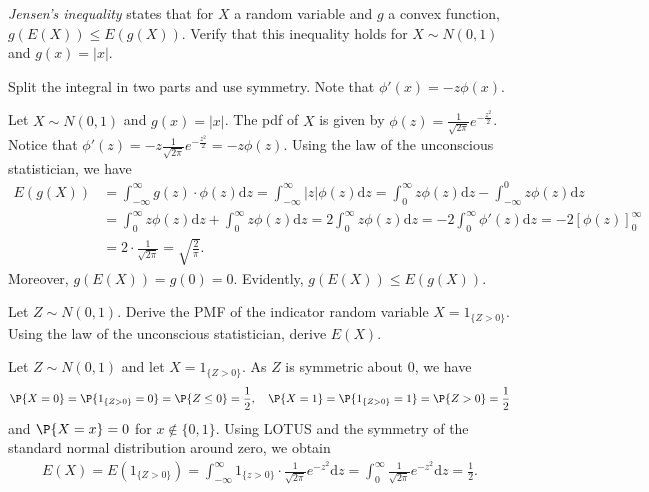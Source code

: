 	\begin{exercise}
		\emph{Jensen's inequality} states that for $X$ a random variable and $g$ a convex function, $g(E(X)) \leq E(g(X))$. Verify that this inequality holds for $X \sim N(0,1)$ and $g(x) = |x|$.
		\begin{hint}
			Split the integral in two parts and use symmetry. Note that $\phi'(x) = -z \phi(x)$.
		\end{hint}
		\begin{solution}
			Let $X \sim N(0,1)$ and $g(x) = |x|$. The pdf of $X$ is given by $\phi(z) = \frac{1}{\sqrt{2 \pi}} e^{- \frac{z^2}{2}}$. Notice that $\phi'(z) = - z \frac{1}{\sqrt{2 \pi}} e^{- \frac{z^2}{2}} = -z \phi(z)$. Using the law of the unconscious statistician, we have
			\begin{align*}
				E(g(X)) & = \int_{-\infty}^{\infty} g(z) \cdot \phi(z) \mathrm{d}z = \int_{-\infty}^{\infty} |z| \phi(z) \mathrm{d}z = \int_0^{\infty} z \phi(z) \mathrm{d}z - \int_{-\infty}^0 z \phi(z) \mathrm{d}z \\
				& = \int_0^{\infty} z \phi(z) \mathrm{d}z + \int_0^{\infty} z \phi(z) \mathrm{d}z = 2 \int_0^{\infty} z \phi(z) \mathrm{d}z = - 2 \int_0^{\infty} \phi'(z) \mathrm{d}z = - 2 \left[\phi(z)\right]_0^{\infty} \\
				& = 2 \cdot \frac{1}{\sqrt{2 \pi}} = \sqrt{\frac{2}{\pi}}.	
			\end{align*}
			Moreover, $g(E(X)) = g(0) = 0$. Evidently, $g(E(X)) \leq E(g(X))$.
		\end{solution}
	\end{exercise}

	\begin{exercise}
	Let $Z \sim N(0,1)$. Derive the PMF of the indicator random variable $X=1_{\{Z>0\}}$. Using the law of the unconscious statistician, derive $E(X)$.
		\begin{solution}
			Let $Z \sim N(0,1)$ and let $X = 1_{\{Z>0\}}$. As $Z$ is symmetric about $0$, we have
			\begin{align*}
				\P{X = 0} = \P{1_{\{Z>0\}} = 0} = \P{Z \leq 0} = \frac{1}{2}, \quad \P{X = 1} = \P{1_{\{Z>0\}} = 1} = \P{Z > 0} = \frac{1}{2}
			\end{align*}
			and $\P{X = x} = 0$ for $x \notin \{0,1\}$. Using LOTUS and the symmetry of the standard normal distribution around zero, we obtain
			\begin{align*}
				E(X) = E\left(1_{\{Z>0\}}\right) = \int_{-\infty}^{\infty} 1_{\{z > 0\}} \cdot \frac{1}{\sqrt{2 \pi}} e^{-z^2} \mathrm{d}z = \int_0^{\infty} \frac{1}{\sqrt{2 \pi}} e^{-z^2} \mathrm{d}z = \frac{1}{2}.
			\end{align*}
		\end{solution}
	\end{exercise}

